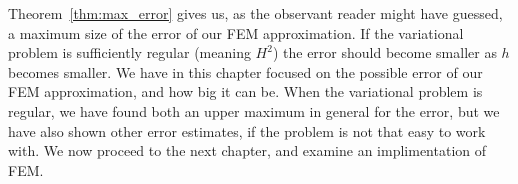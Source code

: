 Theorem~\ref{thm:max_error} gives us, as the observant reader might have guessed, 
a maximum size of the error of our FEM approximation.
If the variational problem is sufficiently regular (meaning $H^2$)
the error should
become smaller as $h$ becomes smaller. 
We have in this chapter focused on the possible error of our FEM approximation, 
and how big it can be. 
When the variational problem is regular, we have found both an upper maximum 
in general for the error, but we have also shown other error estimates, 
if the problem is not that easy to work with.
We now proceed to the next chapter, and examine an implimentation of 
FEM.